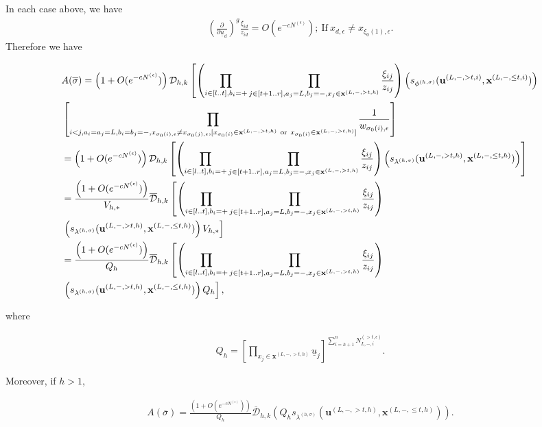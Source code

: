 \documentclass[11pt]{amsart}
\theoremstyle{plain}
\theoremstyle{definition}
\theoremstyle{remark}
\newcommand\ol{\overline}
\newcommand\si{\sigma}
\numberwithin{equation}{section}
\numberwithin{theorem}{section}
\numberwithin{figure}{section}
\begin{document}
In each case above, we have
\begin{align*}
\left(\frac{\partial}{\partial\underline{u}_d}\right)^{g}\frac{\xi_{id}}{z_{id}}=O(e^{-cN^{(\epsilon)}});\ \mathrm{If}\ x_{d,\epsilon}\neq x_{\xi_0(1),\epsilon}.
\end{align*}
Therefore we have
\begin{small}
\begin{align*}
&A(\ol{\si})=\left(1+O(e^{-cN^{(\epsilon)}})\right)\mathcal{D}_{h,k} \left[\left(\prod_{i\in[l..t],b_i=+}
\prod_{j\in[t+1..r],a_j=L,b_j=-,x_j\in \mathbf{x}^{(L,-,>t,h)}}\frac{\xi_{ij}}{z_{ij}}\right)\left(s_{\phi^{(h,\sigma)}}(\mathbf{u}^{(L,-,>t,i)},\mathbf{x}^{(L,-,\leq t,i)})
\right)\right.\\
\notag&\left[\prod_{i<j,a_i=a_j=L,b_i=b_j=-,x_{\si_0(i),\epsilon}\neq x_{\si_0(j),\epsilon},[x_{\si_0(i)}\in \mathbf{x}^{(L,-,>t,h)} \ \mathrm{or}\ x_{\si_0(i)}\in \mathbf{x}^{(L,-,>t,h)}]}\frac{1}{w_{\si_0(i),\epsilon}}\right]\\
&
=\left(1+O(e^{-cN^{(\epsilon)}})\right)\mathcal{D}_{h,k} \left[\left(\prod_{i\in[l..t],b_i=+}
\prod_{j\in[t+1..r],a_j=L,b_j=-,x_j\in \mathbf{x}^{(L,-,>t,h)}}\frac{\xi_{ij}}{z_{ij}}\right)\left(s_{\lambda^{(h,\sigma)}}(\mathbf{u}^{(L,-,>t,h)},\mathbf{x}^{(L,-,\leq t,h)})
\right)\right]\\
&
=\frac{\left(1+O(e^{-cN^{(\epsilon)}})\right)}{V_{h,*}}\ol{\mathcal{D}}_{h,k} \left[\left(\prod_{i\in[l..t],b_i=+}
\prod_{j\in[t+1..r],a_j=L,b_j=-,x_j\in \mathbf{x}^{(L,-,>t,h)}}\frac{\xi_{ij}}{z_{ij}}\right)\right.\\
&\left.\left(s_{\lambda^{(h,\sigma)}}(\mathbf{u}^{(L,-,>t,h)},\mathbf{x}^{(L,-,\leq t,h)})
\right)V_{h,*}\right]\\
&
=\frac{\left(1+O(e^{-cN^{(\epsilon)}})\right)}{Q_h}\ol{\mathcal{D}}_{h,k} \left[\left(\prod_{i\in[l..t],b_i=+}
\prod_{j\in[t+1..r],a_j=L,b_j=-,x_j\in \mathbf{x}^{(L,-,>t,h)}}\frac{\xi_{ij}}{z_{ij}}\right)\right.\\
&\left.\left(s_{\lambda^{(h,\sigma)}}(\mathbf{u}^{(L,-,>t,h)},\mathbf{x}^{(L,-,\leq t,h)})
\right)Q_h\right],
\end{align*}
\end{small}
where
\begin{small}
\begin{align*}
Q_h=\left[\prod_{x_j\in\mathbf{x}^{(L,-,>t,h)}}\underline{u}_j\right]^{\sum_{i=h+1}^n N_{L,-,i}^{(>t,\epsilon)}}.
\end{align*}
\end{small}
Moreover, if $h>1$,
\begin{small}
\begin{align*}
A(\ol{\si})=\frac{(1+O(e^{-cN^{(\epsilon)}}))}{Q_h}\ol{\mathcal{D}}_{h,k} \left(Q_hs_{\lambda^{(h,\sigma)}}(\mathbf{u}^{(L,-,>t,h)},\mathbf{x}^{(L,-,\leq t,h)})
\right).
\end{align*}
\end{small}
\end{document}
